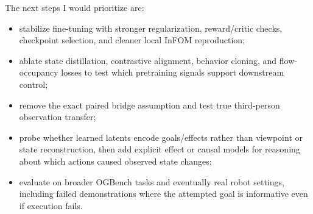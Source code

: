 \documentclass{article}
\begin{document}
The next steps I would prioritize are:
\begin{itemize}[leftmargin=1.5em]
    \item stabilize fine-tuning with stronger regularization, reward/critic checks, checkpoint selection, and cleaner local InFOM reproduction;
    \item ablate state distillation, contrastive alignment, behavior cloning, and flow-occupancy losses to test which pretraining signals support downstream control;
    \item remove the exact paired bridge assumption and test true third-person observation transfer;
    \item probe whether learned latents encode goals/effects rather than viewpoint or state reconstruction, then add explicit effect or causal models for reasoning about which actions caused observed state changes;
    \item evaluate on broader OGBench tasks and eventually real robot settings, including failed demonstrations where the attempted goal is informative even if execution fails.
\end{itemize}

\begingroup
\raggedright
\setlength{\emergencystretch}{3em}


\endgroup
\end{document}
